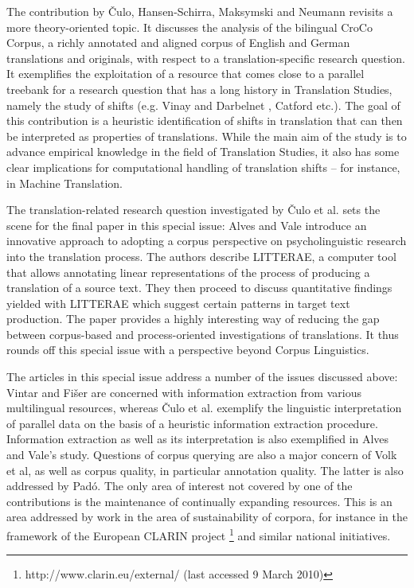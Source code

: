 \documentclass[output=paper]{LSP/langsci}
\begin{document}
The contribution by Čulo, Hansen-Schirra, Maksymski and Neumann revisits a more theory-oriented topic. It discusses the analysis of the bilingual CroCo Corpus, a richly annotated and aligned corpus of English and German translations and originals, with respect to a translation-specific research question. It exemplifies the exploitation of a resource that comes close to a parallel treebank for a research question that has a long history in Translation Studies, namely the study of shifts (e.g. Vinay and Darbelnet \citealt{Vinay1958}, Catford \citealt{Catford1965} etc.). The goal of this contribution is a heuristic identification of shifts in translation that can then be interpreted as properties of translations. While the main aim of the study is to advance empirical knowledge in the field of Translation Studies, it also has some clear implications for computational handling of translation shifts -- for instance, in Machine Translation.

The translation-related research question investigated by Čulo et al. sets the scene for the final paper in this special issue: Alves and Vale introduce an innovative approach to adopting a corpus perspective on psycholinguistic research into the translation process. The authors describe LITTERAE, a computer tool that allows annotating linear representations of the process of producing a translation of a source text. They then proceed to discuss quantitative findings yielded with LITTERAE which suggest certain patterns in target text production. The paper provides a highly interesting way of reducing the gap between corpus-based and process-oriented investigations of translations. It thus rounds off this special issue with a perspective beyond Corpus Linguistics.

The articles in this special issue address a number of the issues discussed above: Vintar and Fišer are concerned with information extraction from various multilingual resources, whereas Čulo et al. exemplify the linguistic interpretation of parallel data on the basis of a heuristic information extraction procedure. Information extraction as well as its interpretation is also exemplified in Alves and Vale's study. Questions of corpus querying are also a major concern of Volk et al, as well as corpus quality, in particular annotation quality. The latter is also addressed by Padó. The only area of interest not covered by one of the contributions is the maintenance of continually expanding resources. This is an area addressed by work in the area of sustainability of corpora, for instance in the framework of the European CLARIN project \footnote{http://www.clarin.eu/external/ (last accessed 9 March 2010)} and similar national initiatives.
\end{document}
